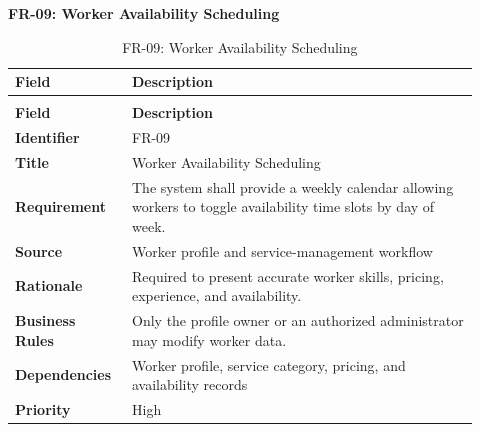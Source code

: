\documentclass[12pt,a4paper]{article}
\begin{document}
\noindent\textbf{FR-09: Worker Availability Scheduling}\par
\vspace{4pt}
\begingroup\small\setlength{\tabcolsep}{4pt}\renewcommand{\arraystretch}{1.15}
\begin{longtable}{|>{\raggedright\arraybackslash}p{0.22\linewidth}|>{\raggedright\arraybackslash}p{0.70\linewidth}|}
\caption{FR-09: Worker Availability Scheduling}\label{tab:fr-09}\\
\hline
\textbf{Field} & \textbf{Description} \\ \hline
\endfirsthead
\multicolumn{2}{c}{Table \thetable\ Worker Availability Scheduling (continued)}\\
\hline
\textbf{Field} & \textbf{Description} \\ \hline
\endhead
\textbf{Identifier} & FR-09 \\ \hline
\textbf{Title} & Worker Availability Scheduling \\ \hline
\textbf{Requirement} & The system shall provide a weekly calendar allowing workers to toggle availability time slots by day of week. \\ \hline
\textbf{Source} & Worker profile and service-management workflow \\ \hline
\textbf{Rationale} & Required to present accurate worker skills, pricing, experience, and availability. \\ \hline
\textbf{Business Rules} & Only the profile owner or an authorized administrator may modify worker data. \\ \hline
\textbf{Dependencies} & Worker profile, service category, pricing, and availability records \\ \hline
\textbf{Priority} & High \\ \hline
\end{longtable}
\endgroup
\end{document}
